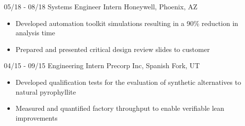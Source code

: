 \documentclass[]{friggeri-cv}
\begin{document}
\begin{entrylist}
\entry
    {05/18 - 08/18}
    {Systems Engineer Intern}
    {Honeywell, Phoenix, AZ}
    {\vspace{-4mm}
    \begin{itemize}
        \item Developed automation toolkit simulations resulting in a 90\% reduction in analysis time
        \item Prepared and presented critical design review slides to customer

    \end{itemize}\vspace{1mm}}

  \entry
    {04/15 - 09/15}
    {Engineering Intern}
    {Precorp Inc, Spanish Fork, UT}
    {\vspace{-4mm}
    \begin{itemize}
        \item Developed qualification tests for the evaluation of synthetic alternatives to natural pyrophyllite
        \item Measured and quantified factory throughput to enable verifiable lean improvements
     \end{itemize}\vspace{1mm}}


\end{entrylist}
\end{document}
